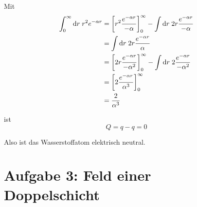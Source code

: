 \documentclass[a4paper,german,12pt,smallheadings]{scrartcl}
\begin{document}
Mit
\begin{align}
  \int_0^\infty \dif r \; r^2 e^{-\alpha r}
  &=
    \sbr[3]{r^2 \frac{e^{-\alpha r}}{-\alpha}}_0^\infty
    - \int \dif r \; 2r \frac{e^{-\alpha r}}{-\alpha} \\
    &= \int \dif r \; 2r \frac{e^{-\alpha r}}{\alpha} \\
    &=  \sbr[3]{2r \frac{e^{-\alpha r}}{-\alpha^2}}_0^\infty
    - \int \dif r \; 2 \frac{e^{-\alpha r}}{-\alpha^2} \\
    &= \sbr[3]{ 2 \frac{e^{-\alpha r}}{\alpha^3}}_0^\infty \\
    &= \frac{2}{\alpha^3}
\end{align}

ist
\begin{equation}
  Q = q - q = 0
\end{equation}

Also ist das Wasserstoffatom elektrisch neutral.

\section*{Aufgabe 3: Feld einer Doppelschicht}
\newcommand{\sgn}{\operatorname{sgn}}
\end{document}
